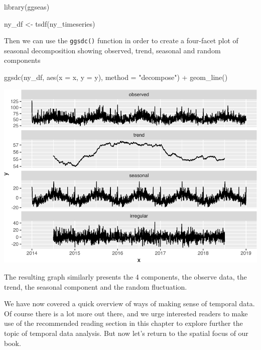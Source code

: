 \documentclass[
]{book}
\newenvironment{Shaded}{\begin{snugshade}}{\end{snugshade}}
\newcommand{\AttributeTok}[1]{\textcolor[rgb]{0.77,0.63,0.00}{#1}}
\newcommand{\FunctionTok}[1]{\textcolor[rgb]{0.00,0.00,0.00}{#1}}
\newcommand{\NormalTok}[1]{#1}
\newcommand{\OtherTok}[1]{\textcolor[rgb]{0.56,0.35,0.01}{#1}}
\newcommand{\SpecialCharTok}[1]{\textcolor[rgb]{0.00,0.00,0.00}{#1}}
\newcommand{\StringTok}[1]{\textcolor[rgb]{0.31,0.60,0.02}{#1}}
\begin{document}
\begin{Shaded}
\begin{Highlighting}[]
\FunctionTok{library}\NormalTok{(ggseas)}

\NormalTok{ny\_df }\OtherTok{\textless{}{-}} \FunctionTok{tsdf}\NormalTok{(ny\_timeseries)}
\end{Highlighting}
\end{Shaded}

Then we can use the \texttt{ggsdc()} function in order to create a four-facet plot of seasonal decomposition showing observed, trend, seasonal and random components

\begin{Shaded}
\begin{Highlighting}[]
\FunctionTok{ggsdc}\NormalTok{(ny\_df, }\FunctionTok{aes}\NormalTok{(}\AttributeTok{x =}\NormalTok{ x, }\AttributeTok{y =}\NormalTok{ y), }
      \AttributeTok{method =} \StringTok{"decompose"}\NormalTok{) }\SpecialCharTok{+}
   \FunctionTok{geom\_line}\NormalTok{()}
\end{Highlighting}
\end{Shaded}

\includegraphics{crime_mapping_files/figure-latex/unnamed-chunk-177-1.pdf}

The resulting graph similarly presents the 4 components, the observe data, the trend, the seasonal component and the random fluctuation.

We have now covered a quick overview of ways of making sense of temporal data. Of course there is a lot more out there, and we urge interested readers to make use of the recommended reading section in this chapter to explore further the topic of temporal data analysis. But now let's return to the spatial focus of our book.
\end{document}
